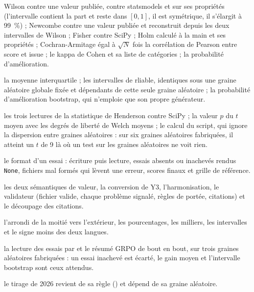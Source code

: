 \begin{description}[style=nextline,leftmargin=1.5em]
  \item[\file{test\_stats.py}] Wilson contre une valeur publiée, contre statsmodels et sur ses
        propriétés (l'intervalle contient la part et reste dans $[0,1]$, il est symétrique, il s'élargit à 99~\%) ; Newcombe contre une valeur publiée et
        reconstruit depuis les deux intervalles de Wilson ; Fisher contre SciPy ; Holm calculé à la
        main et ses propriétés ; Cochran-Armitage égal à $\sqrt N$ fois la corrélation de Pearson
        entre score et issue ; le kappa de Cohen et sa liste de catégories ; la probabilité
        d'amélioration.
  \item[\file{test\_bootstrap.py}] la moyenne interquartile ; les intervalles de rliable, identiques
        sous une graine aléatoire globale fixée et dépendants de cette seule graine aléatoire ; la probabilité
        d'amélioration bootstrap, qui n'emploie que son propre générateur.
  \item[\file{test\_henderson.py}] les trois lectures de la statistique de Henderson contre SciPy ;
        la valeur $p$ du $t$ moyen avec les degrés de liberté de Welch moyens ; le calcul du script,
        qui ignore la dispersion entre graines aléatoires : sur six graines aléatoires fabriquées, il atteint un $t$ de 9
        là où un test sur les graines aléatoires ne voit rien.
  \item[\file{test\_runs.py}] le format d'un essai : écriture puis lecture, essais absents ou
        inachevés rendus \texttt{None}, fichiers mal formés qui lèvent une erreur, scores finaux et
        grille de référence.
  \item[\file{test\_grid.py}] les deux sémantiques de valeur, la conversion de Y3, l'harmonisation,
        le validateur (fichier valide, chaque problème signalé, règles de portée, citations) et le
        découpage des citations.
  \item[\file{test\_formatting.py}] l'arrondi de la moitié vers l'extérieur, les pourcentages, les
        milliers, les intervalles et le signe moins des deux langues.
  \item[\file{test\_pipelines.py}] la lecture des essais par  et le
        résumé GRPO de bout en bout, sur trois graines aléatoires fabriquées : un essai inachevé est écarté, le
        gain moyen et l'intervalle bootstrap sont ceux attendus.
  \item[\file{test\_draw.py}] le tirage de 2026 revient de sa règle () et
        dépend de sa graine aléatoire.
\end{description}

